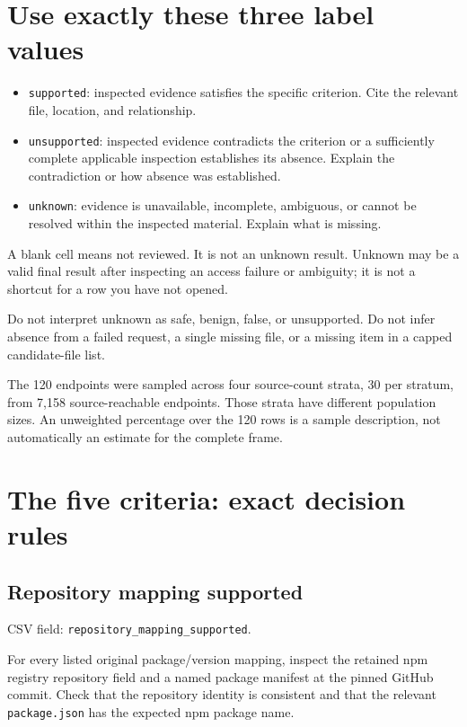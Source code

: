 \documentclass[11pt,a4paper]{article}
\begin{document}
\section{Use exactly these three label values}


\begin{itemize}
\item \nolinkurl{supported}: inspected evidence satisfies the specific criterion. Cite the relevant file, location, and relationship.
\item \nolinkurl{unsupported}: inspected evidence contradicts the criterion or a sufficiently complete applicable inspection establishes its absence. Explain the contradiction or how absence was established.
\item \nolinkurl{unknown}: evidence is unavailable, incomplete, ambiguous, or cannot be resolved within the inspected material. Explain what is missing.
\end{itemize}


A blank cell means not reviewed. It is not an unknown result. Unknown may be a valid final result after inspecting an access failure or ambiguity; it is not a shortcut for a row you have not opened.


Do not interpret unknown as safe, benign, false, or unsupported. Do not infer absence from a failed request, a single missing file, or a missing item in a capped candidate-file list.


The 120 endpoints were sampled across four source-count strata, 30 per stratum, from 7,158 source-reachable endpoints. Those strata have different population sizes. An unweighted percentage over the 120 rows is a sample description, not automatically an estimate for the complete frame.


\section{The five criteria: exact decision rules}


\subsection{Repository mapping supported}


CSV field: \nolinkurl{repository_mapping_supported}.


For every listed original package/version mapping, inspect the retained npm registry repository field and a named package manifest at the pinned GitHub commit. Check that the repository identity is consistent and that the relevant \nolinkurl{package.json} has the expected npm package name.
\end{document}
